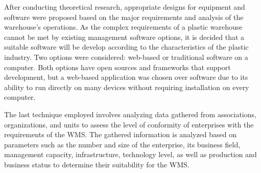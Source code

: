 After conducting theoretical research, appropriate designs for equipment and software were proposed based on the major requirements and analysis of the \linebreak warehouse's operations. As the complex requirements of a plastic warehouse cannot be met by existing management software options, it is decided that a suitable software will be develop according to the characteristics of the plastic industry. Two options were considered: web-based or traditional software on a computer. Both options have open sources and frameworks that support development, but a web-based application was chosen over software due to its ability to run directly on many devices without requiring installation on every computer.

The last technique employed involves analyzing data gathered from associations, organizations, and units to assess the level of conformity of enterprises with the requirements of the WMS. The gathered information is analyzed based on parameters such as the number and size of the enterprise, its business field, management capacity, infrastructure, technology level, as well as production and business status to determine their suitability for the WMS.

\newpage